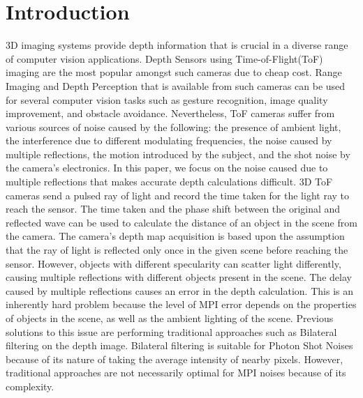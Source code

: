 \documentclass[runningheads]{llncs}
\begin{document}
\section{Introduction}

3D imaging systems provide depth information that is crucial in a diverse range of computer vision applications. Depth Sensors using Time-of-Flight(ToF) imaging are the most popular amongst such cameras due to cheap cost. Range Imaging and Depth Perception that is available from such cameras can be used for several computer vision tasks such as gesture recognition, image quality improvement, and obstacle avoidance. 
Nevertheless, ToF cameras suffer from various sources of noise caused by the following: the presence of ambient light, the interference due to different modulating frequencies, the noise caused by multiple reflections, the motion introduced by the subject, and the shot noise by the camera's electronics. 
In this paper, we focus on the noise caused due to multiple reflections that makes accurate depth calculations difficult. 
\newline
\newline
3D ToF cameras send a pulsed ray of light and record the time taken for the light ray to reach the sensor. The time taken and the phase shift between the original and reflected wave can be used to calculate the distance of an object in the scene from the camera. The camera's depth map acquisition is based upon the assumption that the ray of light is reflected only once in the given scene before reaching the sensor. However, objects with different specularity can scatter light differently, causing multiple reflections with different objects present in the scene. The delay caused by multiple reflections causes an error in the depth calculation. This is an inherently hard problem because the level of MPI error depends on the properties of objects in the scene, as well as the ambient lighting of the scene. 
\newline
\newline
% 
Previous solutions \cite{tomasi1998bilateral,zhang2014rolling} to this issue are performing traditional approaches such as Bilateral filtering on the depth image. 
Bilateral filtering is suitable for Photon Shot Noises because of its nature of taking the average intensity of nearby pixels. 
However, traditional approaches are not necessarily optimal for MPI noises because of its complexity. 
\end{document}
